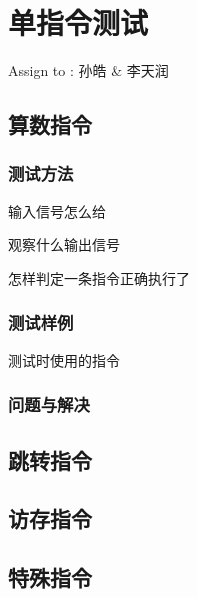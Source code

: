 \section{单指令测试}
    Assign to : 孙皓 & 李天润

    \subsection{算数指令}

        \subsubsection{测试方法}
            输入信号怎么给

            观察什么输出信号

            怎样判定一条指令正确执行了
            
        \subsubsection{测试样例}
            测试时使用的指令

        \subsubsection{问题与解决}

    \subsection{跳转指令}

    \subsection{访存指令}

    \subsection{特殊指令}
